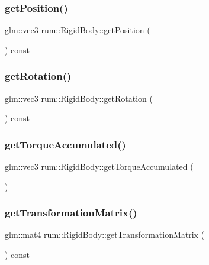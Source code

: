 \subsubsection{\texorpdfstring{get\+Position()}{getPosition()}}
{\footnotesize\ttfamily glm\+::vec3 rum\+::\+Rigid\+Body\+::get\+Position (\begin{DoxyParamCaption}{ }\end{DoxyParamCaption}) const}

\mbox{\label{classrum_1_1_rigid_body_aa99998dba8c818290cfba8dacccd66a2}} 
\subsubsection{\texorpdfstring{get\+Rotation()}{getRotation()}}
{\footnotesize\ttfamily glm\+::vec3 rum\+::\+Rigid\+Body\+::get\+Rotation (\begin{DoxyParamCaption}{ }\end{DoxyParamCaption}) const}

\mbox{\label{classrum_1_1_rigid_body_a9868612d7d60df7abfde0b657d3bad78}} 
\subsubsection{\texorpdfstring{get\+Torque\+Accumulated()}{getTorqueAccumulated()}}
{\footnotesize\ttfamily glm\+::vec3 rum\+::\+Rigid\+Body\+::get\+Torque\+Accumulated (\begin{DoxyParamCaption}{ }\end{DoxyParamCaption})}

\mbox{\label{classrum_1_1_rigid_body_a5e289b46c1849f186295d7f3cdef113d}} 
\subsubsection{\texorpdfstring{get\+Transformation\+Matrix()}{getTransformationMatrix()}}
{\footnotesize\ttfamily glm\+::mat4 rum\+::\+Rigid\+Body\+::get\+Transformation\+Matrix (\begin{DoxyParamCaption}{ }\end{DoxyParamCaption}) const}

